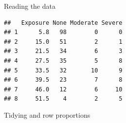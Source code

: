 \begin{frame}[fragile]{Reading the data}

 
\begin{knitrout}
\color{fgcolor}\begin{kframe}
\begin{alltt}
\hlkwb{=}\hlstd{(}\hlstd{,}
\end{alltt}
\begin{verbatim}
##   Exposure None Moderate Severe
## 1      5.8   98        0      0
## 2     15.0   51        2      1
## 3     21.5   34        6      3
## 4     27.5   35        5      8
## 5     33.5   32       10      9
## 6     39.5   23        7      8
## 7     46.0   12        6     10
## 8     51.5    4        2      5
\end{verbatim}
\end{kframe}
\end{knitrout}

  
\end{frame}

\begin{frame}[fragile]{Tidying and row proportions}
  
\begin{knitrout}
\color{fgcolor}
\end{knitrout}
    

  
\end{frame}

